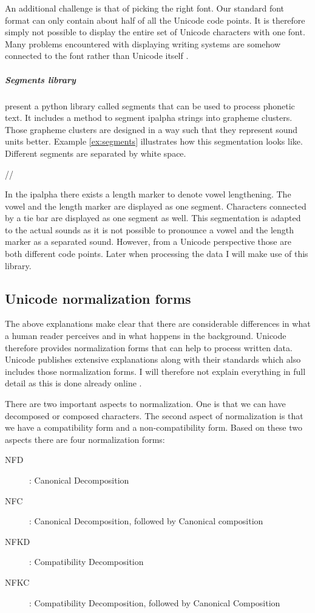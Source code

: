 An additional challenge is that of picking the right font. Our standard font format can only contain about half of all the Unicode code points. It is therefore simply not possible to display the entire set of Unicode characters with one font. Many problems encountered with displaying writing systems are somehow connected to the font rather than Unicode itself \citep{unicode-lingu}.

\subparagraph{Segments library} \citet{unicode-lingu} present a python library called segments that can be used to process phonetic text. It includes a method to segment \ac{ipalpha} strings into grapheme clusters. Those grapheme clusters are designed in a way such that they represent sound units better. Example \ref{ex:segments} illustrates how this segmentation looks like. Different segments are separated by white space.

\begin{covexamples}
\label{ex:segments}
\item //
\end{covexamples}

In the \ac{ipalpha} there exists a length marker to denote vowel lengthening. The vowel and the length marker are displayed as one segment. Characters connected by a tie bar are displayed as one segment as well. This segmentation is adapted to the actual sounds as it is not possible to pronounce a vowel and the length marker as a separated sound. However, from a Unicode perspective those are both different code points. Later when processing the data I will make use of this library.

\subsection*{Unicode normalization forms}
The above explanations make clear that there are considerable differences in what a human reader perceives and in what happens in the background. Unicode therefore provides normalization forms that can help to process written data. Unicode publishes extensive explanations along with their standards which also includes those normalization forms. I will therefore not explain everything in full detail as this is done already online \citep{Unicode.27.08.2021}. 

There are two important aspects to normalization. One is that we can have decomposed or composed characters. The second aspect of normalization is that we have a compatibility form and a non-compatibility form. Based on these two aspects there are four normalization forms:
\begin{description}
\item[NFD] : Canonical Decomposition
\item[NFC] : Canonical Decomposition, followed by Canonical composition
\item[NFKD] : Compatibility Decomposition
\item[NFKC] : Compatibility Decomposition, followed by Canonical Composition
\end{description}

